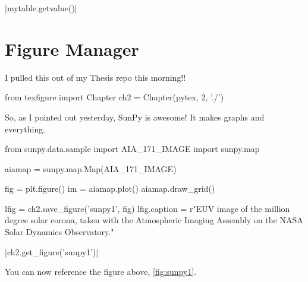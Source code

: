 \documentclass[]{article}
\begin{document}
\py|mytable.getvalue()|


\section{Figure Manager}

I pulled this out of my Thesis repo this morning!!

\begin{pycode}[chapter2]
from texfigure import Chapter
ch2 = Chapter(pytex, 2, './')
\end{pycode}

So, as I pointed out yesterday, SunPy is awesome! It makes graphs and everything.

\begin{pycode}[chapter2]
from sunpy.data.sample import AIA_171_IMAGE
import sunpy.map

aiamap = sunpy.map.Map(AIA_171_IMAGE)

fig = plt.figure()
im = aiamap.plot()
aiamap.draw_grid()

lfig = ch2.save_figure('sunpy1', fig)
lfig.caption = r"EUV image of the million degree solar corona, taken with the Atmospheric Imaging Assembly on the NASA Solar Dynamics Observatory."
\end{pycode}

\py[chapter2]|ch2.get_figure('sunpy1')|

You can now reference the figure above, \ref{fig:sunpy1}.
\end{document}
